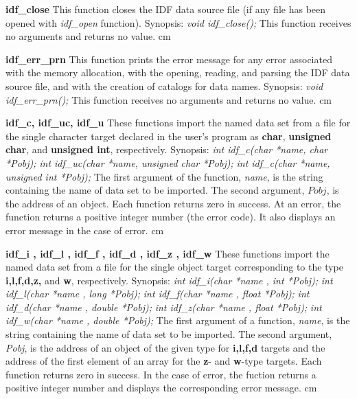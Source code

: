{
{\bf idf\_close}\hfil\break
This function closes the IDF data source file (if any file
has been opened with {\it idf\_open} function).
Synopsis:\hfil\break
{\it void idf\_close();}\hfil\break
This function receives no arguments and returns no value. 
}
 cm

{
{\bf idf\_err\_prn}\hfil\break
This function prints the error message for any error
associated with the memory allocation,
with the opening, reading, and parsing the IDF data source file,
and with the creation of catalogs for data names.
Synopsis:\hfil\break
{\it void idf\_err\_prn();}\hfil\break
This function receives no arguments and returns no value. 
}
 cm

{
{\bf idf\_c, idf\_uc, idf\_u }\hfil\break
These functions import the named data set from a file 
for the single character target declared in the user's program
as {\bf char}, {\bf unsigned char}, and {\bf unsigned int},
respectively.
Synopsis:\hfil\break
{\it int idf\_c(char *name, char *Pobj);}\hfil\break
{\it int idf\_uc(char *name, unsigned char *Pobj);}\hfil\break
{\it int idf\_c(char *name, unsigned int *Pobj);}\hfil\break
The first argument of the function, {\it name}, is the string containing 
the name of data set to be imported. The second argument, $Pobj$,
is the address of an object. Each function returns zero in success.
At an error, the function returns a positive integer number (the error code).
It also displays an error message in the case of error. 
}
 cm

{
{\bf idf\_i , idf\_l , idf\_f , idf\_d , idf\_z , idf\_w}\hfil\break
These functions import the named data set from a file 
for the single object target 
corresponding to the type {\bf i,l,f,d,z,} and {\bf w}, respectively. 
Synopsis:\hfil\break
{\it int idf\_i(char *name , int *Pobj);}\hfil\break
{\it int idf\_l(char *name , long *Pobj);}\hfil\break
{\it int idf\_f(char *name , float *Pobj);}\hfil\break
{\it int idf\_d(char *name , double *Pobj);}\hfil\break
{\it int idf\_z(char *name , float *Pobj);}\hfil\break
{\it int idf\_w(char *name , double *Pobj);}\hfil\break
The first argument of a function, {\it name}, is the string containing 
the name of data set to be imported. The second argument, {\it Pobj},
is the address of an object of the given type for {\bf i,l,f,d} targets
and the address of the first element of an array 
for the {\bf z}- and {\bf w}-type targets.
Each function returns zero in success.
In the case of error, the fuction returns a positive integer number
and displays the corresponding error message. 
}
 cm

